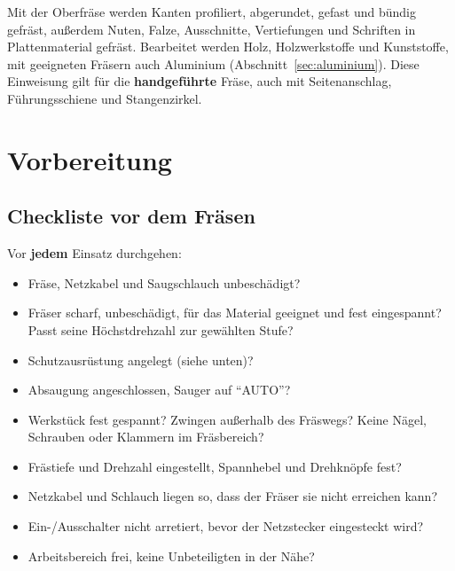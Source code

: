 \documentclass{\basedir/fablab-document}
\begin{document}
	Mit der Oberfräse werden Kanten profiliert, abgerundet, gefast und bündig gefräst, außerdem Nuten, Falze, Ausschnitte, Vertiefungen und Schriften in Plattenmaterial gefräst. Bearbeitet werden Holz, Holzwerkstoffe und Kunststoffe, mit geeigneten Fräsern auch Aluminium (Abschnitt~\ref{sec:aluminium}). Diese Einweisung gilt für die \textbf{handgeführte} Fräse, auch mit Seitenanschlag, Führungsschiene und Stangenzirkel.

	\section{Vorbereitung}

	\subsection{Checkliste vor dem Fräsen}
	Vor \textbf{jedem} Einsatz durchgehen:
	\begin{itemize}
		\item Fräse, Netzkabel und Saugschlauch unbeschädigt?
		\item Fräser scharf, unbeschädigt, für das Material geeignet und fest eingespannt? Passt seine Höchstdrehzahl zur gewählten Stufe?
		\item Schutzausrüstung angelegt (siehe unten)?
		\item Absaugung angeschlossen, Sauger auf \enquote{AUTO}?
		\item Werkstück fest gespannt? Zwingen außerhalb des Fräswegs? Keine Nägel, Schrauben oder Klammern im Fräsbereich?
		\item Frästiefe und Drehzahl eingestellt, Spannhebel und Drehknöpfe fest?
		\item Netzkabel und Schlauch liegen so, dass der Fräser sie nicht erreichen kann?
		\item Ein-/Ausschalter nicht arretiert, bevor der Netzstecker eingesteckt wird?
		\item Arbeitsbereich frei, keine Unbeteiligten in der Nähe?
	\end{itemize}
\end{document}
